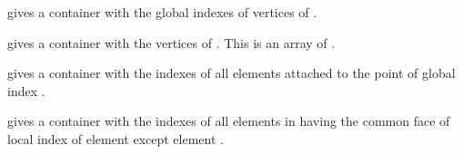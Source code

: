 \documentclass[a4paper,11pt,english]{sphinxmanual}
\begin{document}

\begin{fulllineitems}
\label{\detokenize{userdoc/bmesh:_CPPv4N6getfem4mesh20ind_points_of_convexE1i}}%
\pysigstartmultiline
{}%
\pysigstopmultiline
gives a container with the global indexes of vertices of .

\end{fulllineitems}


\begin{fulllineitems}
\label{\detokenize{userdoc/bmesh:_CPPv4N6getfem4mesh16points_of_convexE1i}}%
\pysigstartmultiline
{}%
\pysigstopmultiline
gives a container with the vertices of . This
is an array of .

\end{fulllineitems}


\begin{fulllineitems}
\label{\detokenize{userdoc/bmesh:_CPPv4N6getfem4mesh15convex_to_pointE3ipt}}%
\pysigstartmultiline
{}%
\pysigstopmultiline
gives a container with the indexes of all elements attached to the
point of global index .

\end{fulllineitems}


\begin{fulllineitems}
\label{\detokenize{userdoc/bmesh:_CPPv4N6getfem4mesh19neighbors_of_convexE2ic1f}}%
\pysigstartmultiline
{}%
\pysigstopmultiline
gives a container with the indexes of all elements in  having
the common face of local index  of element  except element
.

\end{fulllineitems}
\end{document}
